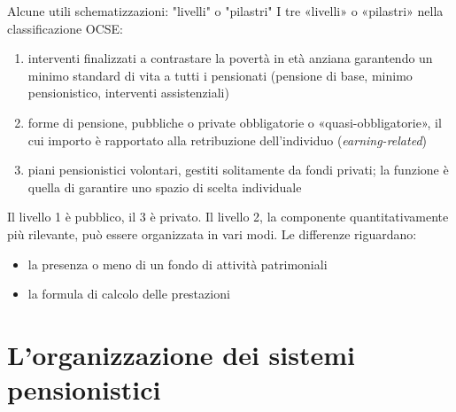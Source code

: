 \documentclass[11pt]{beamer}
\begin{document}
\begin{frame}{Alcune utili schematizzazioni: "livelli" o "pilastri"}
I tre «livelli» o «pilastri» nella classificazione OCSE:
\begin{enumerate}
\item interventi finalizzati a contrastare la povertà in età anziana garantendo
un minimo standard di vita a tutti i pensionati (pensione di base, minimo
pensionistico, interventi assistenziali)
\item forme di pensione, pubbliche o private obbligatorie o «quasi-obbligatorie»,
il cui importo è rapportato alla retribuzione dell’individuo
(\emph{earning-related})
\item piani pensionistici volontari, gestiti solitamente da fondi privati; la
funzione è quella di garantire uno spazio di scelta individuale
\end{enumerate}

Il livello 1 è pubblico, il 3 è privato. Il livello 2, la componente
quantitativamente più rilevante, può essere organizzata in vari modi. Le differenze riguardano:
\begin{itemize}
\item la presenza o meno di un fondo di attività patrimoniali
\item la formula di calcolo delle prestazioni
\end{itemize}
\end{frame}

\section{L'organizzazione dei sistemi pensionistici}
\end{document}
